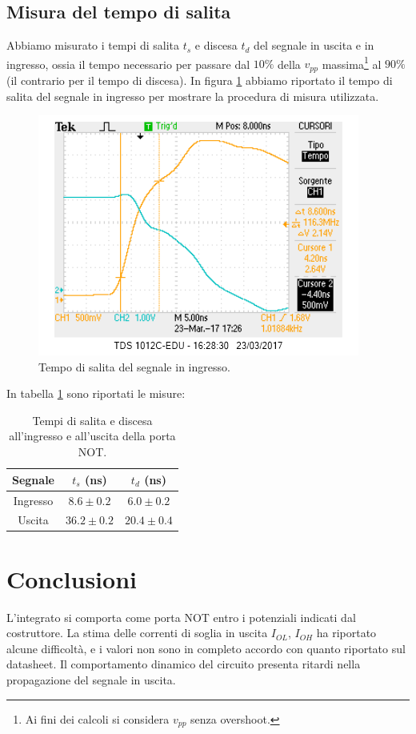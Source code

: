 \documentclass[10pt,a4paper]{article}
\begin{document}
\subsection{Misura del tempo di salita}
Abbiamo misurato i tempi di salita $t_{s}$ e discesa $t_{d}$ del segnale in uscita e in ingresso, ossia il tempo necessario per passare dal $10\%$ della $v_{pp}$ massima\footnote{Ai fini dei calcoli si considera $v_{pp}$ senza overshoot.} al $90\%$ (il contrario per il tempo di discesa).
In figura \ref{fig:tsalitain} abbiamo riportato il tempo di salita del segnale in ingresso per mostrare la procedura di misura utilizzata.
\begin{figure}
\centering
\includegraphics[scale=0.6]{tsalitain.png}
\caption{Tempo di salita del segnale in ingresso.\label{fig:tsalitain}}
\end{figure}

In tabella \ref{tab:tempisalita} sono riportati le misure:
\begin{table}
\centering
\begin{tabular}{|c|c|c|}
\hline
Segnale & $t_{s}$ (ns) & $t_{d}$ (ns) \\
\hline
Ingresso & $8.6 \pm 0.2$  & $6.0 \pm 0.2$  \\
\hline
Uscita & $36.2\pm 0.2$ &  $20.4\pm0.4$    \\
\hline

\end{tabular}
\caption{Tempi di salita e discesa all'ingresso e all'uscita della porta NOT.\label{tab:tempisalita}}
\end{table}
\section{Conclusioni}
L'integrato si comporta come porta NOT entro i potenziali indicati dal costruttore. La stima delle correnti di soglia in uscita $I_{OL}$, $I_{OH}$ ha riportato alcune difficoltà, e i valori non sono in completo accordo con quanto riportato sul datasheet.
Il comportamento dinamico del circuito presenta ritardi nella propagazione del segnale in uscita.
\end{document}
